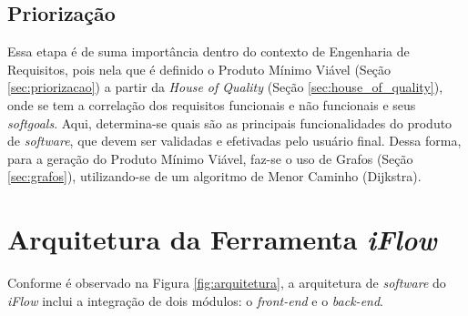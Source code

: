 


\subsection{Priorização}

Essa etapa é de suma importância dentro do contexto de Engenharia de Requisitos, pois nela que é definido o Produto Mínimo Viável (Seção \ref{sec:priorizacao}) a partir da \textit{House of Quality} (Seção \ref{sec:house_of_quality}), onde se tem a correlação dos requisitos funcionais e não funcionais e seus \textit{softgoals}. Aqui, determina-se quais são as principais funcionalidades do produto de \textit{software}, que devem ser validadas e efetivadas pelo usuário final. Dessa forma, para a geração do Produto Mínimo Viável, faz-se o uso de Grafos (Seção \ref{sec:grafos}), utilizando-se de um algoritmo de Menor Caminho (Dijkstra).

\section{Arquitetura da Ferramenta \textit{iFlow}}

\label{sec:arquitetura_da_solucao}

Conforme é observado na Figura \ref{fig:arquitetura}, a arquitetura de \textit{software} do \textit{iFlow} inclui a integração de dois módulos: o \textit{front-end} e o \textit{back-end}.

